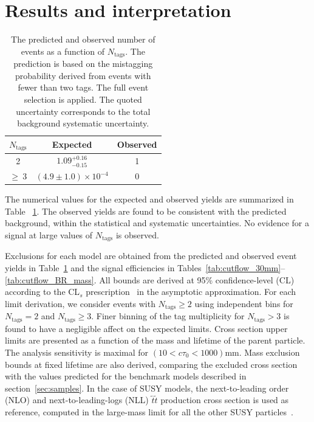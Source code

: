\section{Results and interpretation}
\label{sec:results}

\begin{table}[tb]
  \caption{The predicted and observed number of events as a function
    of $N_{\textrm{tags}}$. The prediction is based on the
    mistagging probability derived from events with fewer than two tags. 
    The full event selection is applied. The quoted uncertainty
    corresponds to the total background systematic uncertainty.\label{tab:result}}
\begin{center}
\begin{tabular}{ccc}
\textbf{$N_{\textrm{tags}}$} & \textbf{Expected} & \textbf{Observed} \\
\hline
2 & $1.09^{+0.16}_{-0.15}$ & 1  \\
$\geq~3$ & $(4.9 \pm 1.0) \times 10^{-4}$ & 0 \\
\end{tabular}
\end{center}
\end{table}

The numerical values for the expected and observed yields are
summarized in Table ~\ref{tab:result}.  The observed yields are found to
be consistent with the predicted background, within the statistical
and systematic uncertainties. No evidence for a signal at large values
of $N_{\textrm{tags}}$ is observed. 

Exclusions for each model are obtained from the predicted and observed
event yields in Table~\ref{tab:result} and the signal efficiencies in
Tables~\ref{tab:cutflow_30mm}--\ref{tab:cutflow_BR_mass}.  All bounds
are derived at 95\% confidence-level (CL) according to the CL$_{s}$
prescription~\cite{CLs1,CLs2,LHCCLs} in the asymptotic approximation.
For each limit derivation, we consider events with $N_{\textrm{tags}}\geq 2$ 
using independent bins for $N_{\textrm{tags}}=2$ and
$N_{\textrm{tags}}\geq 3$. Finer binning of the tag multiplicity for $N_{\textrm{tags}}>3$
is found to have a negligible affect on the expected limits. 
Cross section upper limits are
 presented as a function of the
mass and lifetime of the parent particle.  The analysis sensitivity is
maximal for $(10 < c\tau_0 < 1000)$mm. Mass exclusion bounds at
fixed lifetime are also derived, comparing the excluded cross section
with the values predicted for the benchmark models described in
section~\ref{sec:samples}. In the case of SUSY models, the
next-to-leading order (NLO) and next-to-leading-logs (NLL)
$\tilde{t}\tilde{t}$ production cross section is used as reference,
computed in the large-mass limit for all the other SUSY
particles~\cite{NLONLL1,NLONLL2,NLONLL3,NLONLL4,NLONLL5,NLONLLerr}.


